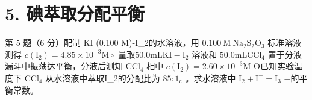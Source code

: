 \section*{5. 碘萃取分配平衡}
第 5 题（6 分）配制 KI (0.100 M)-I_{2}的⽔溶液，⽤ $\mathrm { 0 . 1 0 0 \ M \ N a _ { 2 } S _ { 2 } O _ { 3 } }$ 标准溶液测得 $c ( \mathrm { I } _ { 2 } ) = 4 . 8 5 \times 1 0 ^ { - 3 } \mathrm { M } \circ$ 量取$5 0 . 0 \mathrm { m L } \mathrm { K I - I _ { 2 } }$ 溶液和 $5 0 . 0 \mathrm { m L C C l } _ { 4 }$ 置于分液漏⽃中振荡达平衡，分液后测知 $\mathrm { C C l _ { 4 } }$ 相中 $c ( \mathrm { I } _ { 2 } ) = 2 . 6 0 \times 1 0 ^ { - 3 } \mathrm { M }$ O已知实验温度下 $\mathrm { C C l _ { 4 } }$ 从⽔溶液中萃取I_{2}的分配⽐为 $8 5 { : } 1 _ { \mathrm { c } }$ 。求⽔溶液中 $\mathrm { I } _ { 2 } + \mathrm { I } ^ { - } = \mathrm { I } _ { 3 }$ −的平衡常数。
